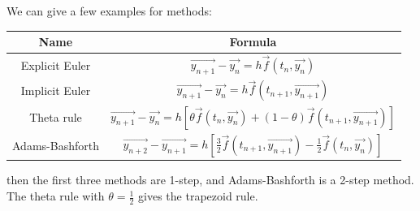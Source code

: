 \documentclass[../Main.tex]{subfiles}
\begin{document}
We can give a few examples for methods:

\begin{tabular}{|c|c|}
    \hline
    Name & Formula \\
    \hline
    Explicit Euler & $\vec{y_{n + 1}} - \vec{y_n} = h\vec{f}(t_n, \vec{y_n})$ \\
    Implicit Euler & $\vec{y_{n + 1}} - \vec{y_n} = h\vec{f}(t_{n+1}, \vec{y_{n+1}})$ \\
    Theta rule & $\vec{y_{n+1}} - \vec{y_n} = h\left[\theta \vec{f}(t_n, \vec{y_n}) + (1-\theta) \vec{f}(t_{n+1}, \vec{y_{n+1}})\right]$ \\
    Adams-Bashforth & $\vec{y_{n+2}} - \vec{y_{n+1}} = h\left[\frac32 \vec{f}(t_{n+1}, \vec{y_{n+1}}) - \frac12 \vec{f}(t_n, \vec{y_{n}})\right]$ \\
    \hline
\end{tabular}
then the first three methods are 1-step, and Adams-Bashforth is a 2-step method. The theta rule with $\theta = \frac12$ gives the trapezoid rule.
\end{document}
